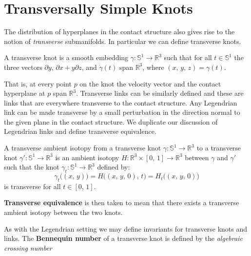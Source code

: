 \section{Transversally Simple Knots}
    The distribution of hyperplanes in the contact structure also gives rise to
    the notion of \textit{transverse} submanifolds. In particular we can define
    transverse knots.
    \begin{definition}
        A transverse knot is a smooth embedding
        $\gamma:\mathbb{S}^{1}\rightarrow\mathbb{R}^{3}$ such that for all
        $t\in\mathbb{S}^{1}$ the three vectors
        $\partial{y}$, $\partial{x}+y\partial{z}$, and
        $\dot{\gamma}(t)$ span $\mathbb{R}^{3}$, where $(x,\,y,\,z)=\gamma(t)$.
    \end{definition}
    That is, at every point $p$ on the knot the velocity vector and the contact
    hyperplane at $p$ span $\mathbb{R}^{3}$. Transverse links can be similarly
    defined and these are links that are everywhere transverse to the contact
    structure. Any Legendrian link can be made transverse by a small
    perturbation in the direction normal to the given plane in the contact
    structure. We duplicate our discussion of Legendrian links and define
    transverse equivalence.
    \begin{definition}
        A transverse ambient isotopy from a transverse knot
        $\gamma:\mathbb{S}^{1}\rightarrow\mathbb{R}^{3}$ to a transverse knot
        $\gamma':\mathbb{S}^{1}\rightarrow\mathbb{R}^{3}$ is an ambient
        isotopy $H:\mathbb{R}^{3}\times[0,\,1]\rightarrow\mathbb{R}^{3}$
        between $\gamma$ and $\gamma'$ such that the knot
        $\gamma_{t}:\mathbb{S}^{1}\rightarrow\mathbb{R}^{3}$ defined by:
        \begin{equation}
            \gamma_{t}\big((x,\,y)\big)
            =H\big((x,\,y,\,0),\,t\big)
            =H_{t}\big((x,\,y,\,0)\big)
        \end{equation}
        is transverse for all $t\in[0,\,1]$.
    \end{definition}
    \textbf{Transverse equivalence} is then taken to mean that there exists
    a transverse ambient isotopy between the two knots.
    \par\hfill\par
    As with the Legendrian setting we may define invariants for transverse
    knots and links. The \textbf{Bennequin number} of a
    transverse knot is defined by the \textit{algebraic crossing number}
